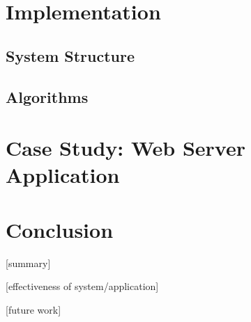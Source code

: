 \documentclass[10pt, twocolumn]{article}
\begin{document}
  \section{Implementation}

    \subsection{System Structure}

    \subsection{Algorithms}

  \section{Case Study: Web Server Application}

  \section{Conclusion}

    [summary]

    [effectiveness of system/application]

    [future work]
\end{document}

